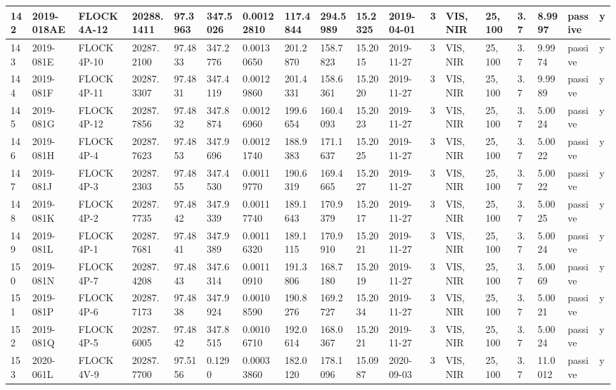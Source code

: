 \documentclass[12pt,a4paper,notitlepage,twoside,openright]{report}
\begin{document}
\begin{longtable}{|l|l|l|l|l|l|l|l|l|l|l|l|l|l|l|l|l|l|}
        142 & 2019-018AE & FLOCK 4A-12 & 20288.1411 & 97.3963 & 347.5026 & 0.00122810 & 117.4844 & 294.5989 & 15.2325 & 2019-04-01 & 3 & VIS, NIR & 25, 100 & 3.7 & 8.9997 & passive & y \\ \hline
        143 & 2019-081E & FLOCK 4P-10 & 20287.2100 & 97.4833 & 347.2776 & 0.00130650 & 201.2870 & 158.7823 & 15.2015 & 2019-11-27 & 3 & VIS, NIR & 25, 100 & 3.7 & 9.9974 & passive & y \\ \hline
        144 & 2019-081F & FLOCK 4P-11 & 20287.3307 & 97.4831 & 347.4119 & 0.00129860 & 201.4331 & 158.6361 & 15.2020 & 2019-11-27 & 3 & VIS, NIR & 25, 100 & 3.7 & 9.9989 & passive & y \\ \hline
        145 & 2019-081G & FLOCK 4P-12 & 20287.7856 & 97.4832 & 347.8874 & 0.00126960 & 199.6654 & 160.4093 & 15.2023 & 2019-11-27 & 3 & VIS, NIR & 25, 100 & 3.7 & 5.0024 & passive & y \\ \hline
        146 & 2019-081H & FLOCK 4P-4 & 20287.7623 & 97.4853 & 347.9696 & 0.00121740 & 188.9383 & 171.1637 & 15.2025 & 2019-11-27 & 3 & VIS, NIR & 25, 100 & 3.7 & 5.0022 & passive & y \\ \hline
        147 & 2019-081J & FLOCK 4P-3 & 20287.2303 & 97.4855 & 347.4530 & 0.00119770 & 190.6319 & 169.4665 & 15.2027 & 2019-11-27 & 3 & VIS, NIR & 25, 100 & 3.7 & 5.0022 & passive & y \\ \hline
        148 & 2019-081K & FLOCK 4P-2 & 20287.7735 & 97.4842 & 347.9339 & 0.00117740 & 189.1643 & 170.9379 & 15.2017 & 2019-11-27 & 3 & VIS, NIR & 25, 100 & 3.7 & 5.0025 & passive & y \\ \hline
        149 & 2019-081L & FLOCK 4P-1 & 20287.7681 & 97.4841 & 347.9389 & 0.00116320 & 189.1115 & 170.9910 & 15.2021 & 2019-11-27 & 3 & VIS, NIR & 25, 100 & 3.7 & 5.0024 & passive & y \\ \hline
        150 & 2019-081N & FLOCK 4P-7 & 20287.4208 & 97.4843 & 347.6314 & 0.00110910 & 191.3806 & 168.7180 & 15.2019 & 2019-11-27 & 3 & VIS, NIR & 25, 100 & 3.7 & 5.0069 & passive & y \\ \hline
        151 & 2019-081P & FLOCK 4P-6 & 20287.7173 & 97.4838 & 347.9924 & 0.00108590 & 190.8276 & 169.2727 & 15.2034 & 2019-11-27 & 3 & VIS, NIR & 25, 100 & 3.7 & 5.0021 & passive & y \\ \hline
        152 & 2019-081Q & FLOCK 4P-5 & 20287.6005 & 97.4842 & 347.8515 & 0.00106710 & 192.0614 & 168.0367 & 15.2021 & 2019-11-27 & 3 & VIS, NIR & 25, 100 & 3.7 & 5.0024 & passive & y \\ \hline
        153 & 2020-061L & FLOCK 4V-9 & 20287.7700 & 97.5156 & 0.1290 & 0.00033860 & 182.0120 & 178.1096 & 15.0987 & 2020-09-03 & 3 & VIS, NIR & 25, 100 & 3.7 & 11.0012 & passive & y \\ \hline

\end{longtable}
\end{document}
